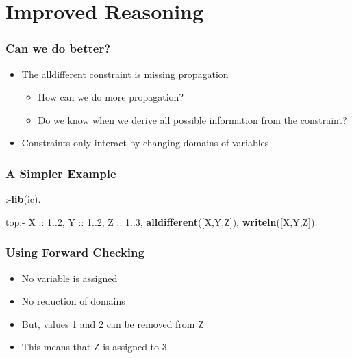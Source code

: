 \documentclass{beamer}
\begin{document}
\section{Improved Reasoning}

\begin{frame}
\frametitle{Can we do better?}
\begin{itemize}
\item The alldifferent constraint is missing propagation
\begin{itemize}
\item How can we do more propagation?
\item Do we know when we derive all possible information from the constraint?
\end{itemize}
\item Constraints only interact by changing domains of variables
\end{itemize}
\end{frame}

\begin{frame}[fragile]
\frametitle{A Simpler Example}
\begin{semiverbatim}
:-{\bf{}lib}(ic).

top:-
    X :: 1..2,
    Y :: 1..2,
    Z :: 1..3,
    {\bf{}alldifferent}([X,Y,Z]),
    {\bf{}writeln}([X,Y,Z]).
\end{semiverbatim}
\end{frame}

\begin{frame}
\frametitle{Using Forward Checking}
\begin{itemize}
\item No variable is assigned
\item No reduction of domains
\item But, values 1 and 2 can be removed from Z
\item This means that Z is assigned to 3
\end{itemize}
\end{frame}
\end{document}
